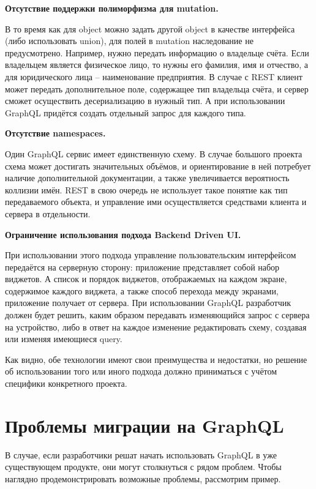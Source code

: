 \textbf{Отсутствие поддержки полиморфизма для mutation.}

В то время как для object можно задать другой object в качестве интерфейса (либо использовать union), для полей в mutation наследование не предусмотрено.
Например, нужно передать информацию о владельце счёта.
Если владельцем является физическое лицо, то нужны его фамилия, имя и отчество, а для юридического лица – наименование предприятия.
В случае с REST клиент может передать дополнительное поле, содержащее тип владельца счёта, и сервер сможет осуществить десериализацию в нужный тип.
А при использовании GraphQL придётся создать отдельный запрос для каждого типа.

\textbf{Отсутствие namespaces.}

Один GraphQL сервис имеет единственную схему.
В случае большого проекта схема может достигать значительных объёмов, и ориентирование в ней потребует наличие дополнительной документации, а также увеличивается вероятность коллизии имён.
REST в свою очередь не использует такое понятие как тип передаваемого объекта, и управление ими осуществляется средствами клиента и сервера в отдельности.

\textbf{Ограничение использования подхода Backend Driven UI.}

При использовании этого подхода управление пользовательским интерфейсом передаётся на серверную сторону: приложение представляет собой набор виджетов.
А список и порядок виджетов, отображаемых на каждом экране, содержимое каждого виджета, а также способ перехода между экранами, приложение получает от сервера.
При использовании GraphQL разработчик должен будет решить, каким образом передавать изменяющийся запрос с сервера на устройство, либо в ответ на каждое изменение редактировать схему, создавая или изменяя имеющиеся query.

Как видно, обе технологии имеют свои преимущества и недостатки, но решение об использовании того или иного подхода должно приниматься с учётом специфики конкретного проекта.


\section{Проблемы миграции на GraphQL}\label{sec:migration-to-graphql}

В случае, если разработчики решат начать использовать GraphQL в уже существующем продукте, они могут столкнуться с рядом проблем.
Чтобы наглядно продемонстрировать возможные проблемы, рассмотрим пример.

